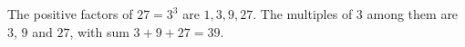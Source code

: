 The positive factors of $27=3^3$ are $1,3,9,27$. The multiples of $3$ among them are $3$, $9$ and $27$, with sum $3+9+27=\boxed{39}$.
